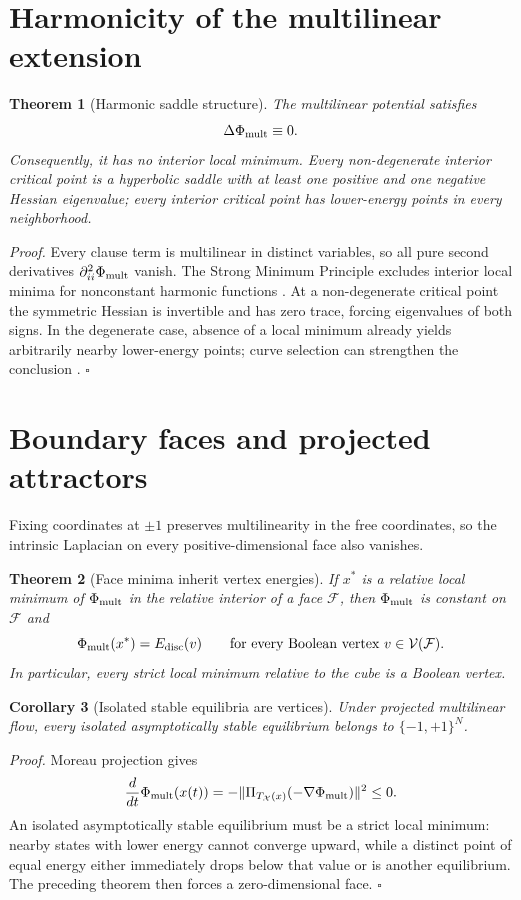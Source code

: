 \documentclass[11pt,a4paper]{article}
\newtheorem{theorem}{Theorem}[section]
\newtheorem{corollary}[theorem]{Corollary}
\newcommand{\X}{\mathcal X}
\begin{document}
\section{Harmonicity of the multilinear extension}
\begin{theorem}[Harmonic saddle structure]
The multilinear potential satisfies
\[
\Delta\Phi_{\rm mult}\equiv0.
\]
Consequently, it has no interior local minimum. Every non-degenerate interior critical point is a hyperbolic saddle with at least one positive and one negative Hessian eigenvalue; every interior critical point has lower-energy points in every neighborhood.
\end{theorem}

\noindent\textit{Proof.} Every clause term is multilinear in distinct variables, so all pure second derivatives $\partial_{ii}^2\Phi_{\rm mult}$ vanish. The Strong Minimum Principle excludes interior local minima for nonconstant harmonic functions \cite{Courant,Evans}. At a non-degenerate critical point the symmetric Hessian is invertible and has zero trace, forcing eigenvalues of both signs. In the degenerate case, absence of a local minimum already yields arbitrarily nearby lower-energy points; curve selection can strengthen the conclusion \cite{Milnor}. \hfill$\square$

\section{Boundary faces and projected attractors}
Fixing coordinates at $\pm1$ preserves multilinearity in the free coordinates, so the intrinsic Laplacian on every positive-dimensional face also vanishes.

\begin{theorem}[Face minima inherit vertex energies]
If $x^*$ is a relative local minimum of $\Phi_{\rm mult}$ in the relative interior of a face $\mathcal F$, then $\Phi_{\rm mult}$ is constant on $\mathcal F$ and
\[
\Phi_{\rm mult}(x^*)=E_{\rm disc}(v)\qquad\text{for every Boolean vertex }v\in\mathcal V(\mathcal F).
\]
In particular, every strict local minimum relative to the cube is a Boolean vertex.
\end{theorem}

\begin{corollary}[Isolated stable equilibria are vertices]
Under projected multilinear flow, every isolated asymptotically stable equilibrium belongs to $\{-1,+1\}^N$.
\end{corollary}

\noindent\textit{Proof.} Moreau projection gives
\[
\frac{d}{dt}\Phi_{\rm mult}(x(t))=-\|\Pi_{T_\X(x)}(-\nabla\Phi_{\rm mult})\|^2\le0.
\]
An isolated asymptotically stable equilibrium must be a strict local minimum: nearby states with lower energy cannot converge upward, while a distinct point of equal energy either immediately drops below that value or is another equilibrium. The preceding theorem then forces a zero-dimensional face. \hfill$\square$
\end{document}
